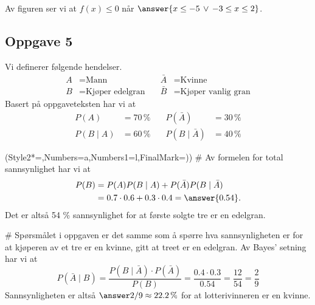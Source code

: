 \begin{easylist}[enumerate]
\begin{figure}[ht!]
	\end{figure}

Av figuren ser vi at $ f(x)\leq 0 $ når $\answer{x\leq -5 \, \vee \, -3\leq x \leq 2}$.
\end{easylist}



\subsection*{Oppgave 5}
Vi definerer følgende hendelser.
\begin{align*}
	A &= \text{Mann}\quad&\bar A &= \text{Kvinne}	\\
	B &= \text{Kjøper edelgran}\quad &\bar B &= \text{Kjøper vanlig gran}
\end{align*}
Basert på oppgaveteksten har vi at
\begin{align*}
	P(A) &= 70 \, \% \quad& P(\bar A) &= 30 \, \%	\\
	P(B \mid A) &=60 \, \%\quad & P( B \mid \bar A) &= 40 \, \% 
\end{align*}

\begin{easylist}[enumerate]
\ListProperties(Style2*=,Numbers=a,Numbers1=l,FinalMark={)})
#  Av formelen for total sannsynlighet har vi at
\begin{align*}
	P(B) &= P(A)P(B \mid A)+P(\bar A)P(B \mid \bar A) \\
	&= 0.7 \cdot 0.6 + 0.3 \cdot 0.4 = \answer{0.54}.
\end{align*}
Det er altså 54 \% sannsynlighet for at første solgte tre er en edelgran.


# Spørsmålet i oppgaven er det samme som å spørre hva sannsynligheten er for at kjøperen av et tre er en kvinne, gitt at treet er en edelgran. 
Av Bayes' setning har vi at
\begin{equation*}
		P(\bar A \mid B)	= \frac{P(B \mid \bar A)\cdot P(\bar A)}{P(B)} 
		= \frac{0.4\cdot 0.3}{0.54} 
		= \frac{12}{54}
		= \frac{2}{9}
\end{equation*}
Sannsynligheten er altså $ \answer{2/9 \approx 22.2 \, \%}$ for at lotterivinneren er en kvinne.
\end{easylist}



